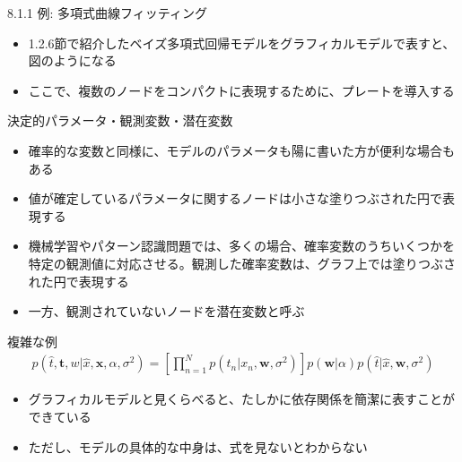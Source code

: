\begin{frame}{8.1.1 例: 多項式曲線フィッティング}
 \begin{itemize}
  \item 1.2.6節で紹介したベイズ多項式回帰モデルをグラフィカルモデルで表すと、図のようになる
  \item ここで、複数のノードをコンパクトに表現するために、\alert{プレート}を導入する
 \end{itemize}
\end{frame}

\begin{frame}{決定的パラメータ・観測変数・潜在変数}
 \begin{itemize}
  \item 確率的な変数と同様に、モデルのパラメータも陽に書いた方が便利な場合もある
  \item 値が確定しているパラメータに関するノードは小さな塗りつぶされた円で表現する
  \item 機械学習やパターン認識問題では、多くの場合、確率変数のうちいくつかを特定の観測値に対応させる。観測した確率変数は、グラフ上では塗りつぶされた円で表現する
  \item 一方、観測されていないノードを潜在変数と呼ぶ
 \end{itemize}
\end{frame}

\begin{frame}{複雑な例}
 \begin{eqnarray*}
  p(\hat{t}, \bm{t}, w| \hat{x}, \bm{x}, \alpha , \sigma^2) = \left[\prod_{n=1}^{N}p(t_n|x_n, \bm{w}, \sigma^2)\right]p(\bm{w}|\alpha)p(\hat{t}|\hat{x}, \bm{w}, \sigma^2)
 \end{eqnarray*}
 \begin{itemize}
  \item グラフィカルモデルと見くらべると、たしかに依存関係を簡潔に表すことができている
  \item ただし、モデルの具体的な中身は、式を見ないとわからない
 \end{itemize}
\end{frame}
